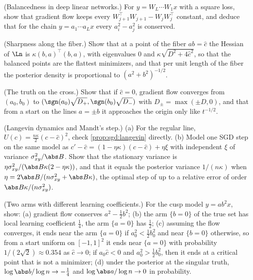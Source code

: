 \begin{refsection}
\begin{exercises}
\item \consolidation (Balancedness in deep linear networks.) For $y=W_L\cdots W_1x$ with a square loss, show that gradient flow keeps every $W_{j+1}^\top W_{j+1}-W_jW_j^\top$ constant, and deduce that for the chain $y=a_1\cdots a_Lx$ every $a_i^2-a_j^2$ is conserved.\label{ex:sgd:dln}

\item \consolidation (Sharpness along the fiber.) Show that at a point of the fiber $ab=\hat c$ the Hessian of $\Ln$ is $\kappa(b,a)^\top(b,a)$, with eigenvalues $0$ and $\kappa\sqrt{D^2+4\hat c^2}$, so that the balanced points are the flattest minimizers, and that per unit length of the fiber the posterior density is proportional to $(a^2+b^2)^{-1/2}$.\label{ex:sgd:sharp}

\item \consolidation (The truth on the cross.) Show that if $\hat c=0$, gradient flow converges from $(a_0,b_0)$ to $(\sgn(a_0)\sqrt{D_+},\sgn(b_0)\sqrt{D_-})$ with $D_\pm=\max(\pm D,0)$, and that from a start on the lines $a=\pm b$ it approaches the origin only like $t^{-1/2}$.\label{ex:sgd:zero}

\item \consolidation (Langevin dynamics and Mandt's step.) (a) For the regular line, $U(c)=\frac{n\kappa}2(c-\hat c)^2$, check \cref{prop:sgd:langevin} directly. (b) Model one SGD step on the same model as $c'-\hat c=(1-\eta\kappa)(c-\hat c)+\eta\xi$ with independent $\xi$ of variance $\sgdvar/\abs B$. Show that the stationary variance is $\eta\sgdvar/(\abs B\kappa(2-\eta\kappa))$, and that it equals the posterior variance $1/(n\kappa)$ when $\eta=2\abs B/(n\sgdvar+\abs B\kappa)$, the optimal step of \textcite{MandtEtAl2017} up to a relative error of order $\abs B\kappa/(n\sgdvar)$.\label{ex:sgd:mandt}

\item \byhand (Two arms with different learning coefficients.) For the cusp model $y=ab^2x$, show: (a) gradient flow conserves $a^2-\frac12b^2$; (b) the arm $\{b=0\}$ of the true set has local learning coefficient $\frac14$, the arm $\{a=0\}$ has $\frac12$; (c) assuming the flow converges, it ends near the arm $\{a=0\}$ if $a_0^2<\frac12b_0^2$ and near $\{b=0\}$ otherwise, so from a start uniform on $[-1,1]^2$ it ends near $\{a=0\}$ with probability $1/(2\sqrt2)\approx0.354$ as $\hat c\to0$; if $a_0\hat c<0$ and $a_0^2>\frac12b_0^2$, then it ends at a critical point that is not a minimizer; (d) under the posterior at the singular truth, $\log\abs b/\log n\to-\frac14$ and $\log\abs a/\log n\to0$ in probability.\label{ex:sgd:cusp}


\end{exercises}
\end{refsection}
